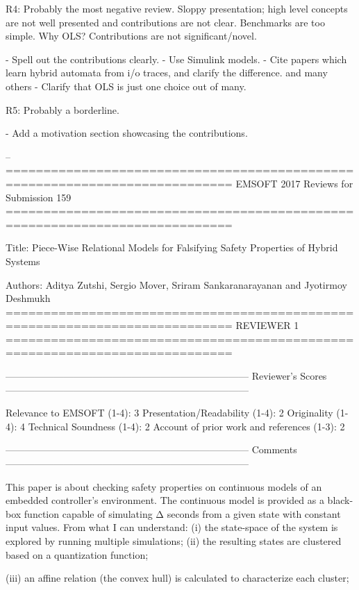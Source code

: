 R4: Probably the most negative review.
Sloppy presentation; high level concepts are not well presented
and contributions are not clear. Benchmarks are too simple. Why OLS?
Contributions are not significant/novel.

- Spell out the contributions clearly.
- Use Simulink models.
- Cite papers which learn hybrid automata from i/o traces, and clarify
  the difference.
  \cite{medhat2015framework} and many others
- Clarify that OLS is just one choice out of many.

R5: Probably a borderline.

- Add a motivation section showcasing the contributions.

--
============================================================================
EMSOFT 2017 Reviews for Submission 159
============================================================================

Title: Piece-Wise Relational Models for Falsifying Safety Properties of Hybrid Systems

Authors: Aditya Zutshi, Sergio Mover, Sriram Sankaranarayanan and Jyotirmoy Deshmukh
============================================================================
                            REVIEWER 1
============================================================================


---------------------------------------------------------------------------
Reviewer's Scores
---------------------------------------------------------------------------

               Relevance to EMSOFT (1-4): 3
          Presentation/Readability (1-4): 2
                       Originality (1-4): 4
               Technical Soundness (1-4): 2
Account of prior work and references (1-3): 2


---------------------------------------------------------------------------
Comments
---------------------------------------------------------------------------

This paper is about checking safety properties on continuous models of an
embedded controller's environment. The continuous model is provided as a
black-box function capable of simulating Δ seconds from a given state with
constant input values. From what I can understand: (i) the state-space of
the system is explored by running multiple simulations; (ii) the resulting
states are clustered based on a quantization function; 

(iii) an affine
relation (the convex hull) is calculated to characterize each cluster; 


